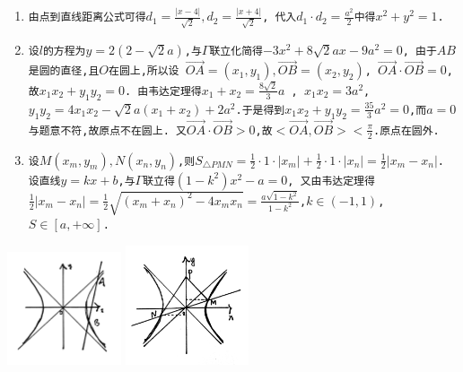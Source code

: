 \documentclass[oneside]{book}
\newcommand{\1}{\underline{\makebox[1cm]{}}}
\newcommand{\2}{\underline{\makebox[2cm]{}}}
\newcommand{\3}{\underline{\makebox[3cm]{}}}
\newcommand{\4}{\underline{\makebox[4cm]{}}}
\newcommand{\lge}{\large \texttt}
\newcommand{\xl}{\overrightarrow}
\newlength{\la}
\begin{document}
        \begin{minipage}[b]{0.65\linewidth}
            \begin{enumerate}[(1)]
                \item \lge{由点到直线距离公式可得$d_1 = \frac{|x - 4|}{\sqrt{2}}, d_2 = \frac{|x + 4|}{\sqrt{2}}$, 代入$d_1 \cdot d_2 = \frac{a^2}{2}$中得$x^2 + y^2 = 1$.}
                \item \lge{设$l$的方程为$y = 2(2 - \sqrt{2}a)$,与$\Gamma$联立化简得$-3x^2 +8\sqrt{2}ax - 9a^2 = 0$, 由于$AB$是圆的直径,且$O$在圆上,所以设
                $\xl{OA} = (x_1, y_1), \xl{OB} = (x_2, y_2)$, $\xl{OA} \cdot \xl{OB} = 0$, 故$x_1x_2 + y_1y_2 = 0$. 由韦达定理得$x_1 + x_2 = \frac{8\sqrt{2}}{3}a$
                , $x_1x_2 = 3a^2$, $y_1y_2 = 4x_1x_2 - \sqrt{2}a(x_1 + x_2) + 2a^2$.于是得到$x_1x_2 + y_1y_2 = \frac{35}{3}a^2 = 0$,而$a = 0$与题意不符,故原点不在圆上.
                又$\xl{OA} \cdot \xl{OB} > 0$,故$<\xl{OA}, \xl{OB}> < \frac{\pi}{2}$.原点在圆外.}
                \item \lge{设$M(x_m, y_m), N(x_n, y_n)$,则$S_{\triangle PMN}  = \frac{1}{2} \cdot 1 \cdot |x_m| + \frac{1}{2} \cdot 1 \cdot |x_n| = \frac{1}{2}|x_m - x_n|$.
                设直线$y = kx + b$,与$\Gamma$联立得$(1 - k^2)x^2 - a = 0$, 又由韦达定理得$\frac{1}{2}|x_m - x_n| = \frac{1}{2}\sqrt{(x_m + x_n)^2 - 4x_mx_n} = \frac{a\sqrt{1-k^2}}{1-k^2}$,$k \in (-1, 1)$, $S \in [a, +\infty]$.}
            \end{enumerate}
        \end{minipage}
        \begin{minipage}[b]{0.25\linewidth}
            \centering
            \includegraphics[height = 95pt]{2.png}
            \hfill
            \includegraphics[height = 100pt]{3.png}
        \end{minipage}
\end{document}
